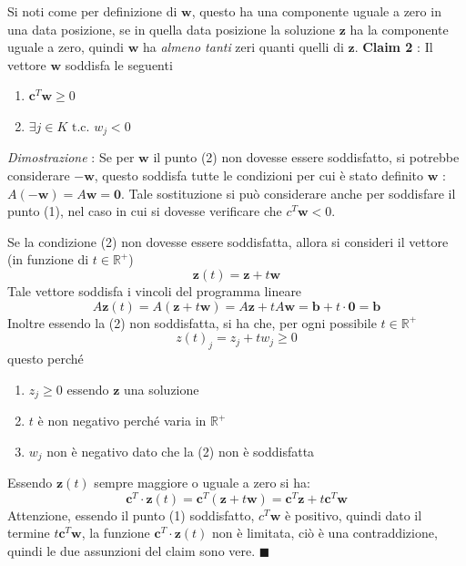 \documentclass[10pt, letterpaper]{report}
\begin{document}
Si noti come per definizione di $\mathbf w$, questo ha una componente uguale a zero in una data posizione, se in quella data posizione la soluzione $\mathbf z$ ha la componente uguale a zero, quindi $\mathbf w$ ha \textit{almeno tanti} zeri quanti quelli di $\mathbf z$.\acc 
\textbf{Claim 2} : Il vettore $\mathbf w$ soddisfa le seguenti\begin{enumerate}
    \item $\mathbf c^T\mathbf w \ge 0$
    \item $\exists j\in K \text{ t.c. }w_j<0$
\end{enumerate}
\textit{Dimostrazione} : Se per $\mathbf w$ il punto (2) non dovesse essere soddisfatto, si potrebbe considerare $-\mathbf w$, questo soddisfa tutte le condizioni per cui è stato definito $\mathbf w$ : $A(-\mathbf w)=A\mathbf w =\mathbf 0$. Tale sostituzione si può considerare anche per soddisfare il punto (1), nel caso in cui si dovesse verificare che $c^T\mathbf w<0$.

Se la condizione (2) non dovesse essere soddisfatta, allora si consideri il vettore (in funzione di $t\in\mathbb R^+$)  $$\mathbf z(t)=\mathbf{z}+t\mathbf w$$
Tale vettore soddisfa i vincoli del programma lineare 
$$A\mathbf z(t)=A(\mathbf z + t\mathbf w)=A\mathbf z+tA\mathbf w=\mathbf b + t\cdot \mathbf 0 = \mathbf b $$
Inoltre essendo la (2) non soddisfatta, si ha che, per ogni possibile $t\in\mathbb R^+$ $$ z(t)_j=z_j+tw_j\ge 0$$ questo perché \begin{enumerate}
    \item $z_j\ge 0$ essendo $\mathbf z$ una soluzione 
    \item $t$ è non negativo perché varia in $\mathbb  R^+$
    \item $w_j$ non è negativo dato che la (2) non è soddisfatta
\end{enumerate}
Essendo $\mathbf z(t)$ sempre maggiore o uguale a zero si ha: \begin{equation}
    \mathbf c^T \cdot \mathbf z(t)= \mathbf c^T (\mathbf z + t\mathbf w)=\mathbf c^T \mathbf z + t\mathbf c^T \mathbf w
\end{equation}
Attenzione, essendo il punto (1) soddisfatto, $c^T \mathbf w$ è positivo, quindi dato il termine $t\mathbf c^T \mathbf w$, la funzione $ \mathbf c^T \cdot \mathbf z(t)$ non è limitata, ciò è una contraddizione, quindi le due assunzioni del claim sono vere. \hfill$\blacksquare$\bigskip
\end{document}

